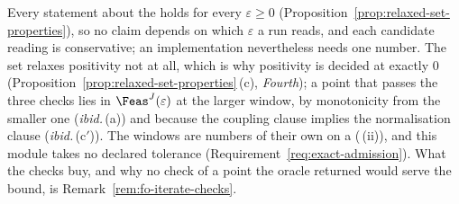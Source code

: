 
Every statement about the  holds for every
$\varepsilon\ge0$ (Proposition~\ref{prop:relaxed-set-properties}), so no
claim depends on which $\varepsilon$ a run reads, and each candidate reading
is conservative; an implementation nevertheless needs one number. The set
relaxes positivity not at all, which is why positivity is decided at
exactly $0$ (Proposition~\ref{prop:relaxed-set-properties}\,(c),
\emph{Fourth}); a point that passes the three checks lies in
$\Feas^{J}(\varepsilon)$ at the larger window, by monotonicity from the
smaller one (\emph{ibid.}\,(a)) and because the coupling clause implies the
normalisation clause (\emph{ibid.}\,(c$'$)). The windows are numbers of
their own on a 
(\,(ii)), and this module takes no
declared tolerance (Requirement~\ref{req:exact-admission}). What the checks
buy, and why no check of a point the oracle returned would serve the bound,
is Remark~\ref{rem:fo-iterate-checks}.


